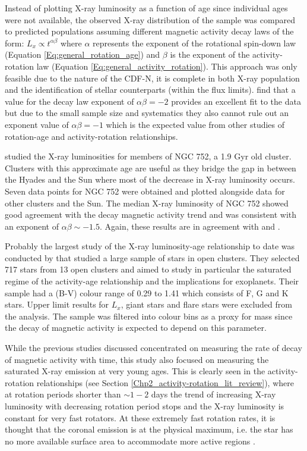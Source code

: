 Instead of plotting X-ray luminosity as a function of age since individual ages were not available, the observed X-ray distribution of the sample was compared to predicted populations assuming different magnetic activity decay laws of the form: $L_{x} \propto t^{\alpha\beta}$ where $\alpha$ represents the exponent of the rotational spin-down law (Equation \ref{Eq:general_rotation_age}) and $\beta$ is the exponent of the activity-rotation law (Equation \ref{Eq:general_activity_rotation}). This approach was only feasible due to the nature of the CDF-N, it is complete in both X-ray population and the identification of stellar counterparts (within the flux limits). \citet{Feigelson_etal_2004} find that a value for the decay law exponent of $\alpha\beta = -2$ provides an excellent fit to the data but due to the small sample size and systematics they also cannot rule out an exponent value of $\alpha\beta = -1$ which is the expected value from other studies of rotation-age and activity-rotation relationships.

\citet{Giardino_etal_2008} studied the X-ray luminosities for members of NGC 752, a 1.9 Gyr old cluster. Clusters with this approximate age are useful as they bridge the gap in between the Hyades and the Sun where most of the decrease in X-ray luminosity occurs. Seven data points for NGC 752 were obtained and plotted alongside data for other clusters and the Sun. The median X-ray luminosity of NGC 752 showed good agreement with the decay magnetic activity trend and was consistent with an exponent of $\alpha\beta \sim -1.5$. Again, these results are in agreement with \citet{Maggio_etal_1987} and \citet{Feigelson_etal_2004}.

Probably the largest study of the X-ray luminosity-age relationship to date was conducted by \citet{Jackson_etal_2012} that studied a large sample of stars in open clusters. They selected 717 stars from 13 open clusters and aimed to study in particular the saturated regime of the activity-age relationship and the implications for exoplanets. Their sample had a (B-V) colour range of 0.29 to 1.41 which consists of F, G and K stars. Upper limit results for $L_{x}$, giant stars and flare stars were excluded from the analysis. The sample was filtered into colour bins as a proxy for mass since the decay of magnetic activity is expected to depend on this parameter.

While the previous studies discussed concentrated on measuring the rate of decay of magnetic activity with time, this study also focused on measuring the saturated X-ray emission at very young ages. This is clearly seen in the activity-rotation relationships (see Section \ref{Chp2_activity-rotation_lit_review}), where at rotation periods shorter than $\sim 1-2$ days the trend of increasing X-ray luminosity with decreasing rotation period stops and the X-ray luminosity is constant for very fast rotators. At these extremely fast rotation rates, it is thought that the coronal emission is at the physical maximum, i.e. the star has no more available surface area to accommodate more active regions \citep{Jardine_Unruh_1999}.

